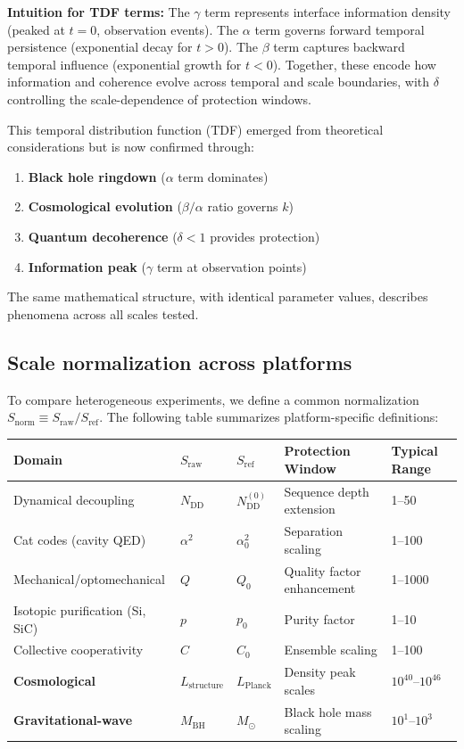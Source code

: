 \textbf{Intuition for TDF terms:} The $\gamma$ term represents interface information density (peaked at $t=0$, observation events). The $\alpha$ term governs forward temporal persistence (exponential decay for $t>0$). The $\beta$ term captures backward temporal influence (exponential growth for $t<0$). Together, these encode how information and coherence evolve across temporal and scale boundaries, with $\delta$ controlling the scale-dependence of protection windows.

This temporal distribution function (TDF) emerged from theoretical considerations but is now confirmed through:

\begin{enumerate}
\item \textbf{Black hole ringdown} ($\alpha$ term dominates)
\item \textbf{Cosmological evolution} ($\beta/\alpha$ ratio governs $k$)
\item \textbf{Quantum decoherence} ($\delta < 1$ provides protection)
\item \textbf{Information peak} ($\gamma$ term at observation points)
\end{enumerate}

The same mathematical structure, with identical parameter values, describes phenomena across all scales tested.

\subsection{Scale normalization across platforms}

To compare heterogeneous experiments, we define a common normalization $S_{\text{norm}} \equiv S_{\text{raw}} / S_{\text{ref}}$. The following table summarizes platform-specific definitions:

\begin{table}[h]
\centering
\begin{tabular}{|l|l|l|l|l|}
\hline
\textbf{Domain} & $S_{\text{raw}}$ & $S_{\text{ref}}$ & \textbf{Protection Window} & \textbf{Typical Range} \\
\hline
Dynamical decoupling & $N_{\text{DD}}$ & $N_{\text{DD}}^{(0)}$ & Sequence depth extension & 1--50 \\
Cat codes (cavity QED) & $\alpha^2$ & $\alpha_0^2$ & Separation scaling & 1--100 \\
Mechanical/optomechanical & $Q$ & $Q_0$ & Quality factor enhancement & 1--1000 \\
Isotopic purification (Si, SiC) & $p$ & $p_0$ & Purity factor & 1--10 \\
Collective cooperativity & $C$ & $C_0$ & Ensemble scaling & 1--100 \\
\textbf{Cosmological} & $L_{\text{structure}}$ & $L_{\text{Planck}}$ & Density peak scales & $10^{40}$--$10^{46}$ \\
\textbf{Gravitational-wave} & $M_{\text{BH}}$ & $M_\odot$ & Black hole mass scaling & $10^1$--$10^3$ \\
\hline
\end{tabular}
\end{table}

